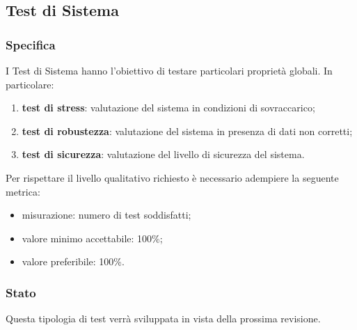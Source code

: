 \subsection{Test di Sistema}

	\subsubsection{Specifica}
		I Test di Sistema hanno l'obiettivo di testare particolari proprietà globali. In particolare:
		\begin{enumerate}
			\item{\textbf{test di stress}: valutazione del sistema in condizioni di sovraccarico;}
			\item{\textbf{test di robustezza}: valutazione del sistema in presenza di dati non corretti;}
			\item{\textbf{test di sicurezza}: valutazione del livello di sicurezza del sistema.}
		\end{enumerate}
		Per rispettare il livello qualitativo richiesto è necessario adempiere la seguente metrica:
		\begin{itemize}
			\item{misurazione: numero di test soddisfatti;}
			\item{valore minimo accettabile: 100\%;}
			\item{valore preferibile: 100\%.}
		\end{itemize}
	
	
	\subsubsection{Stato}
		Questa tipologia di test verrà sviluppata in vista della prossima revisione.